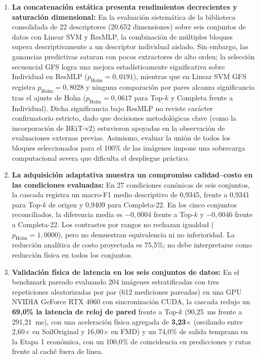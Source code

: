\begin{enumerate}
\item \textbf{La concatenación estática presenta rendimientos decrecientes y saturación dimensional:} En la evaluación sistemática de la biblioteca consolidada de 22 descriptores (20.652 dimensiones) sobre seis conjuntos de datos con Linear SVM y ResMLP, la combinación de múltiples bloques supera descriptivamente a un descriptor individual aislado. Sin embargo, las ganancias predictivas saturan con pocos extractores de alto orden; la selección secuencial GFS logra una mejora estadísticamente significativa sobre Individual en ResMLP ($p_{\text{Holm}}=0{,}0191$), mientras que en Linear SVM GFS registra $p_{\text{Holm}}=0{,}8028$ y ninguna comparación por pares alcanza significancia tras el ajuste de Holm ($p_{\text{Holm}}=0{,}0617$ para Top-$k$ y Completa frente a Individual). Dicha significancia bajo ResMLP no reviste carácter confirmatorio estricto, dado que decisiones metodológicas clave (como la incorporación de BEiT-v2) estuvieron apoyadas en la observación de evaluaciones externas previas. Asimismo, evaluar la unión de todos los bloques seleccionados para el 100\% de las imágenes impone una sobrecarga computacional severa que dificulta el despliegue práctico.

\item \textbf{La adquisición adaptativa muestra un compromiso calidad--costo en las condiciones evaluadas:} En 27 condiciones canónicas de seis conjuntos, la cascada registra un macro-F1 medio descriptivo de 0{,}9345, frente a 0{,}9341 para Top-$k$ de origen y 0{,}9409 para Completa-22. En los cinco conjuntos reconciliados, la diferencia media es $-0{,}0004$ frente a Top-$k$ y $-0{,}0046$ frente a Completa-22. Los contrastes por rangos no rechazan igualdad ($p_{\text{Holm}}=1{,}0000$), pero no demuestran equivalencia ni no inferioridad. La reducción analítica de costo proyectada es 75{,}5\%; no debe interpretarse como reducción física en todos los conjuntos.

\item \textbf{Validación física de latencia en los seis conjuntos de datos:} En el benchmark pareado evaluando 204 imágenes estratificadas con tres repeticiones aleatorizadas por par (612 mediciones pareadas) en una GPU NVIDIA GeForce RTX 4060 con sincronización CUDA, la cascada redujo un \textbf{69{,}0\% la latencia de reloj de pared} frente a Top-$k$ (90{,}25~ms frente a 291{,}21~ms), con una aceleración física agregada de \textbf{3{,}23$\times$} (oscilando entre 2{,}60$\times$ en SoilOriginal y 16{,}00$\times$ en FMD) y un 74{,}0\% de salida temprana en la Etapa 1 económica, con un 100{,}0\% de coincidencia en predicciones y rutas frente al caché fuera de línea.


\end{enumerate}
